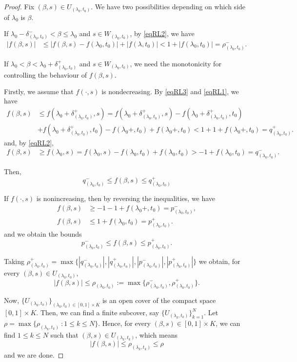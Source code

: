 \documentclass[10pt,a4paper]{amsart}
\begin{document}
\begin{proof}
 Fix $(\beta,s)\in U_{(\lambda_0,t_0)}$. We have two possibilities
depending on which side of $\lambda_0$ is $\beta$.

\medskip
If $\lambda_0-\delta_{(\lambda_0,t_0)}^-<\beta\leq \lambda_0$ and $s\in W_{(\lambda_0,t_0)}$, by \eqref{eqRL2}, we have
\begin{align*}
|f(\beta,s)| &\leq |f(\beta,s)-f(\lambda_0,t_0)|+|f(\lambda,t_0)|<1
+|f(\lambda_0,t_0)|=\rho_{(\lambda_0,t_0)}^-.
\end{align*}

If  $\lambda_0<\beta<\lambda_0 +\delta_{(\lambda_0,t_0)}^+$ and $s\in W_{(\lambda_0,t_0)}$,  we  need the monotonicity for controlling the behaviour of $f(\beta,s)$.

Firstly,  we assume that $f(\cdot,s)$ is nondecreasing.
By \eqref{eqRL3} and \eqref{eqRL1}, we have
\begin{align*}
f(\beta,s) &\leq f(\lambda_0 +\delta_{(\lambda_0,t_0)}^+,s)=f(\lambda_0 +\delta_{(\lambda_0,t_0)}^+,s)-f(\lambda_0 +\delta_{(\lambda_0,t_0)}^+,t_0)\\
&+ f(\lambda_0 +\delta_{(\lambda_0,t_0)}^+,t_0 )-f(\lambda_0+,t_0)+f(\lambda_0+,t_0)<1+1+f(\lambda_0+,t_0)=q_{(\lambda_0,t_0)}^+.
\end{align*}
and, by \eqref{eqRL2},
\begin{align*}
f(\beta,s) &\geq f(\lambda_0,s)=f(\lambda_0,s)-f(\lambda_0,t_0)+ f(\lambda_0,t_0 )>-1+f(\lambda_0,t_0)=q_{(\lambda_0,t_0)}^-.
\end{align*}

Then,
$$q_{(\lambda_0,t_0)}^-\leq f(\beta,s)\leq q_{(\lambda_0,t_0)}^+$$

If $f(\cdot,s)$ is nonincreasing, then by reversing the inequalities, we have
\begin{align*}
f(\beta,s) &\geq -1-1+f(\lambda_0+,t_0)=p_{(\lambda_0,t_0)}^-,\\
f(\beta,s) &\leq 1+f(\lambda_0,t_0)=p_{(\lambda_0,t_0)}^+.
\end{align*}
and we obtain the bounds
$$p_{(\lambda_0,t_0)}^-\leq f(\beta,s)\leq p_{(\lambda_0,t_0)}^+.$$

Taking $\rho_{(\lambda_0,t_0)}^+=\max\{|q_{(\lambda_0,t_0)}^-|, |q_{(\lambda_0,t_0)}^+|,|p_{(\lambda_0,t_0)}^-|,|p_{(\lambda_0,t_0)}^+|\}$
we obtain, for every $(\beta,s) \in U_{(\lambda_0,t_0)}$,
$$|f(\beta,s)|\leq\rho_{(\lambda_0,t_0)}:=\max\{\rho_{(\lambda_0,t_0)}^-,\rho_{(\lambda_0,t_0)}^+\}.$$

Now,
 $\{  U_{(\lambda_0,t_0)}\}_{(\lambda_0,t_0)\in[0,1]\times K}$ is an open cover of the compact space $[0,1]\times K$. Then, we can find a finite subcover, say
 $\{  U_{(\lambda_k,t_k)}\}_{k=1}^{N}$.
 Let $\rho=\max\{ \rho_{(\lambda_k,t_k)}\ : 1\leq k\leq N\}$. Hence,
 for every $(\beta,s)\in [0,1]\times K$, we can find $1\leq k\leq N$ such that
 $(\beta,s)\in U_{(\lambda_k,t_k)}$, which means
 $$|f(\beta,s)|\leq\rho_{(\lambda_k,t_k)}\leq \rho$$
 and we are done.
\end{proof}
\end{document}

